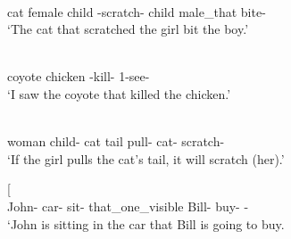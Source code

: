 \pagebreak
\begin{exe}\ex\label{YavDep}
\begin{xlist}
\ex\gll  {\rm[}   \textipa{k-ttmo:-c}{\rm]}   \\
         \hspaceThis{[}cat female child \relativ{}-scratch-\nom{} child male\_that bite-\compl{}\\
\glt `The cat that scratched the girl bit the boy.'%

\ex\gll  {\rm[}  \textipa{k-ne:h-a}{\rm]} \\
         \hspaceThis{[}coyote chicken \relativ{}-kill-\tns{} 1-see-\compl{}\\
\glt `I saw the coyote that killed the chicken.' %

\ex\gll  {\rm[}    \textipa{syo:m-kiTo}{\rm]}  \\
         \hspaceThis{[}woman child-\nom{} cat tail pull-\cond{} cat-\nom{} scratch-\fut{}\\
\glt `If the girl pulls the cat's tail, it will scratch (her).'


\ex\gll{}   {\rm[}   \textipa{no:-km}{\rm]}\\
       John-\nom{} car-\ines{} sit-\allo{} \hspaceThis{[}that\_one\_visible Bill-\nom{} buy-\ego{} \fut{}-\icml{}\\
\glt `John is sitting in the car that Bill is going to buy.

\end{xlist}
\end{exe}

